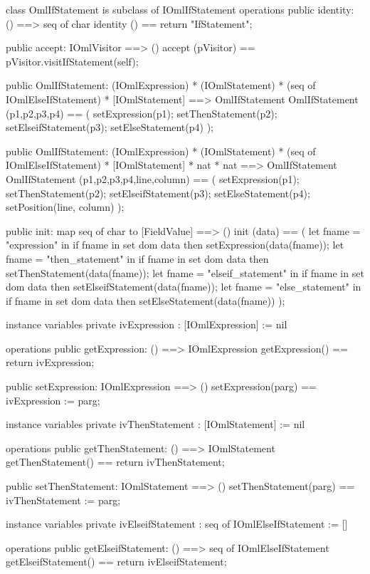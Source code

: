 \begin{vdm_al}
class OmlIfStatement is subclass of IOmlIfStatement
operations
  public identity: () ==> seq of char
  identity () == return "IfStatement";

  public accept: IOmlVisitor ==> ()
  accept (pVisitor) == pVisitor.visitIfStatement(self);

  public OmlIfStatement:
    (IOmlExpression) *
    (IOmlStatement) *
    (seq of IOmlElseIfStatement) *
    [IOmlStatement] ==> OmlIfStatement
  OmlIfStatement (p1,p2,p3,p4) == 
    ( setExpression(p1);
      setThenStatement(p2);
      setElseifStatement(p3);
      setElseStatement(p4) );

  public OmlIfStatement:
    (IOmlExpression) *
    (IOmlStatement) *
    (seq of IOmlElseIfStatement) *
    [IOmlStatement] *
    nat *
    nat ==> OmlIfStatement
  OmlIfStatement (p1,p2,p3,p4,line,column) == 
    ( setExpression(p1);
      setThenStatement(p2);
      setElseifStatement(p3);
      setElseStatement(p4);
      setPosition(line, column) );

  public init: map seq of char to [FieldValue] ==> ()
  init (data) ==
    ( let fname = "expression" in
        if fname in set dom data
        then setExpression(data(fname));
      let fname = "then_statement" in
        if fname in set dom data
        then setThenStatement(data(fname));
      let fname = "elseif_statement" in
        if fname in set dom data
        then setElseifStatement(data(fname));
      let fname = "else_statement" in
        if fname in set dom data
        then setElseStatement(data(fname)) );

instance variables
  private ivExpression : [IOmlExpression] := nil

operations
  public getExpression: () ==> IOmlExpression
  getExpression() == return ivExpression;

  public setExpression: IOmlExpression ==> ()
  setExpression(parg) == ivExpression := parg;

instance variables
  private ivThenStatement : [IOmlStatement] := nil

operations
  public getThenStatement: () ==> IOmlStatement
  getThenStatement() == return ivThenStatement;

  public setThenStatement: IOmlStatement ==> ()
  setThenStatement(parg) == ivThenStatement := parg;

instance variables
  private ivElseifStatement : seq of IOmlElseIfStatement := []

operations
  public getElseifStatement: () ==> seq of IOmlElseIfStatement
  getElseifStatement() == return ivElseifStatement;


\end{vdm_al}
